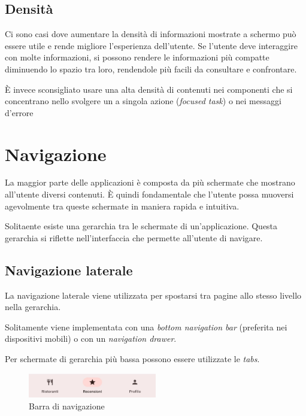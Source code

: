 \documentclass[12pt, a4paper]{report}
\begin{document}
		\subsection{Densità}
			Ci sono casi dove aumentare la densità di informazioni mostrate a schermo può essere utile e rende migliore l'esperienza dell'utente.
			Se l'utente deve interaggire con molte informazioni, si possono rendere le informazioni più compatte diminuendo lo spazio tra loro, rendendole più facili da consultare e confrontare.

			È invece sconsigliato usare una alta densità di contenuti nei componenti che si concentrano nello svolgere un a singola azione (\textit{focused task}) o nei messaggi d'errore

		
	\section{Navigazione}
    	La maggior parte delle applicazioni è composta da più schermate che mostrano all’utente diversi contenuti. È quindi fondamentale che l’utente possa muoversi agevolmente tra queste schermate in maniera rapida e intuitiva.

    	Solitaente esiste una gerarchia tra le schermate di un'applicazione. Questa gerarchia si riflette nell'interfaccia che permette all'utente di navigare.

    		\subsection{Navigazione laterale}
    		La navigazione laterale viene utilizzata per spostarsi tra pagine allo stesso livello nella gerarchia.

    		Solitamente viene implementata con una \textit{bottom navigation bar} (preferita nei dispositivi mobili) o con un \textit{navigation drawer}.

    		Per schermate di gerarchia più bassa possono essere utilizzate le \textit{tabs}.

    		\begin{figure}[h]
   			\centering
   			\includegraphics[width=0.5\textwidth]{navbar}
 			\caption{Barra di navigazione}
    			\label{fig:mesh1}
		\end{figure}
\end{document}
